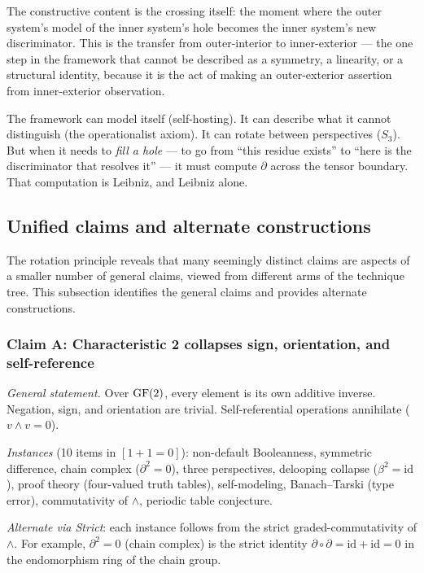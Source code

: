 The constructive content is the crossing itself: the
moment where the outer system's model of the inner
system's hole becomes the inner system's new
discriminator. This is the transfer from outer-interior
to inner-exterior --- the one step in the framework that
cannot be described as a symmetry, a linearity, or a
structural identity, because it is the act of making an
outer-exterior assertion from inner-exterior observation.

The framework can model itself (self-hosting). It can
describe what it cannot distinguish (the operationalist
axiom). It can rotate between perspectives ($S_3$). But
when it needs to \emph{fill a hole} --- to go from
``this residue exists'' to ``here is the discriminator
that resolves it'' --- it must compute $\partial$ across
the tensor boundary. That computation is Leibniz, and
Leibniz alone.


\subsection{Unified claims and alternate constructions}
\label{sec:unified}

The rotation principle reveals that many seemingly
distinct claims are aspects of a smaller number of
general claims, viewed from different arms of the
technique tree. This subsection identifies the general
claims and provides alternate constructions.

\subsubsection*{Claim A: Characteristic 2 collapses sign,
  orientation, and self-reference}

\emph{General statement.} Over $\operatorname{GF}(2)$, every element
is its own additive inverse. Negation, sign, and
orientation are trivial. Self-referential operations
annihilate ($v \wedge v = 0$).

\emph{Instances} (10 items in $[1{+}1{=}0]$):
non-default Booleanness, symmetric difference,
chain complex ($\partial^2 = 0$), three perspectives,
delooping collapse ($\beta^2 = \mathrm{id}$), proof
theory (four-valued truth tables), self-modeling,
Banach--Tarski (type error), commutativity of $\wedge$,
periodic table conjecture.

\emph{Alternate via Strict}: each instance follows
from the strict graded-commutativity of $\wedge$.
For example, $\partial^2 = 0$ (chain complex) is
the strict identity
$\partial \circ \partial = \mathrm{id} + \mathrm{id}
= 0$ in the endomorphism ring of the chain group.

